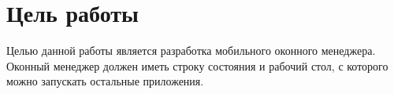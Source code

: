 \section{Цель работы}
Целью данной работы является разработка мобильного оконного менеджера. Оконный менеджер должен иметь строку состояния и рабочий стол, с которого можно запускать остальные приложения.